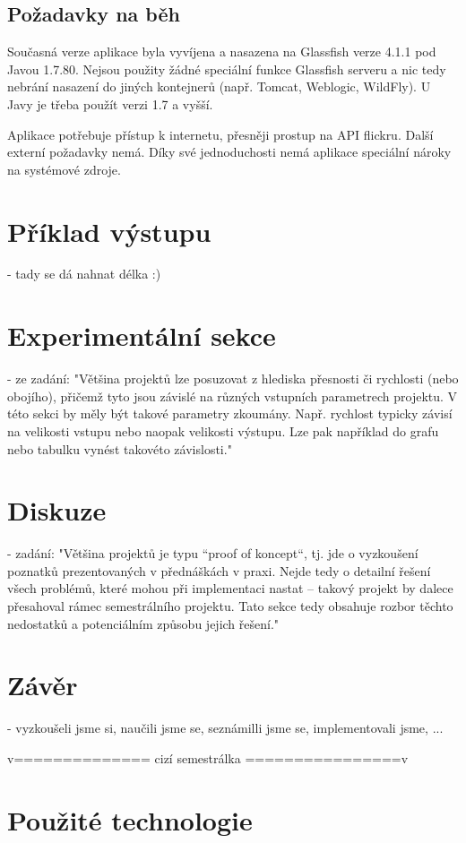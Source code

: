 \documentclass[12pt,oneside,a4paper]{article}
\begin{document}
\subsection{Požadavky na běh}

Současná verze aplikace byla vyvíjena a nasazena na Glassfish verze 4.1.1 pod Javou 1.7.80. Nejsou použity žádné speciální funkce Glassfish serveru a nic tedy nebrání nasazení do jiných kontejnerů (např. Tomcat, Weblogic, WildFly). U Javy je třeba použít verzi 1.7 a vyšší.

Aplikace potřebuje přístup k internetu, přesněji prostup na API flickru. Další externí požadavky nemá. Díky své jednoduchosti nemá aplikace speciální nároky na systémové zdroje.


\section{Příklad výstupu}
- tady se dá nahnat délka :)

\section{Experimentální sekce}
- ze zadání: "Většina projektů lze posuzovat z hlediska přesnosti či rychlosti (nebo obojího),
přičemž tyto jsou závislé na různých vstupních parametrech projektu. V této sekci by
měly být takové parametry zkoumány. Např. rychlost typicky závisí na velikosti
vstupu nebo naopak velikosti výstupu. Lze pak například do grafu nebo tabulku
vynést takovéto závislosti."

\section{Diskuze}
- zadání: "Většina projektů je typu “proof of koncept“, tj. jde o vyzkoušení poznatků
prezentovaných v přednáškách v praxi. Nejde tedy o detailní řešení všech problémů,
které mohou při implementaci nastat – takový projekt by dalece přesahoval rámec
semestrálního projektu. Tato sekce tedy obsahuje rozbor těchto nedostatků a
potenciálním způsobu jejich řešení."

\section{Závěr}
- vyzkoušeli jsme si, naučili jsme se, seznámilli jsme se, implementovali jsme, ...

v============== cizí semestrálka ================v

\section{Použité technologie}
\end{document}

